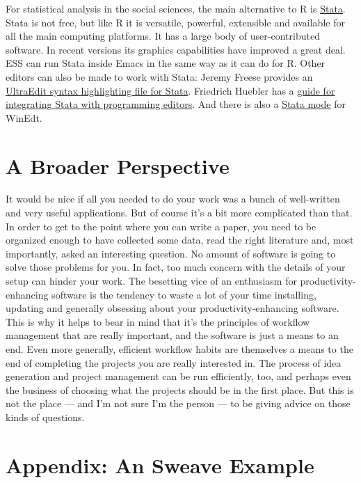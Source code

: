 \documentclass[11pt,article,oneside]{memoir}
\begin{document}
For statistical analysis in the social sciences, the main alternative to R is \href{http://www.stata.com/}{Stata}. Stata is not free, but like R it is versatile, powerful, extensible and available for all the main computing platforms. It has a large body of user-contributed software. In recent versions its graphics capabilities have improved a great deal. ESS can run Stata inside Emacs in the same way as it can do for R. Other editors can also be made to work with Stata: Jeremy Freese provides an  \href{http://www.jeremyfreese.com/#other%20research}{UltraEdit syntax highlighting file for Stata}. Friedrich Huebler has a \href{http://mysite.verizon.net/huebler/2005/20050310_Stata_editor.html}{guide for integrating Stata with programming editors}. And there is also a \href{http://www.winedt.org/Config/modes/Stata.php}{Stata mode} for WinEdt.


\section{A Broader Perspective} 
It would be nice if all you needed to do your work was a bunch of well-written and very useful applications. But of course it's a bit more complicated than that. In order to get to the point where you can write a paper, you need to be organized enough to have collected some data, read the right literature and, most importantly, asked an interesting question. No amount of software is going to solve those problems for you. In fact, too much concern with the details of your setup can hinder your work. The besetting vice of an enthusiasm for productivity-enhancing software is the tendency to waste a lot of your time installing, updating and generally obsessing about your productivity-enhancing software. This is why it helps to bear in mind that it's the principles of workflow management that are really important, and the software is just a means to an end. Even more generally, efficient workflow habits are themselves a means to the end of completing the projects you are really interested in. The process of idea generation and project management can be run efficiently, too, and perhaps even the business of choosing what the projects should be in the first place. But this is not the place --- and I'm not sure I'm the person --- to be giving advice on those kinds of questions.

\appendix

\section*{Appendix: An Sweave Example} %
\label{sec:an_sweave_example}
 
\end{document}
